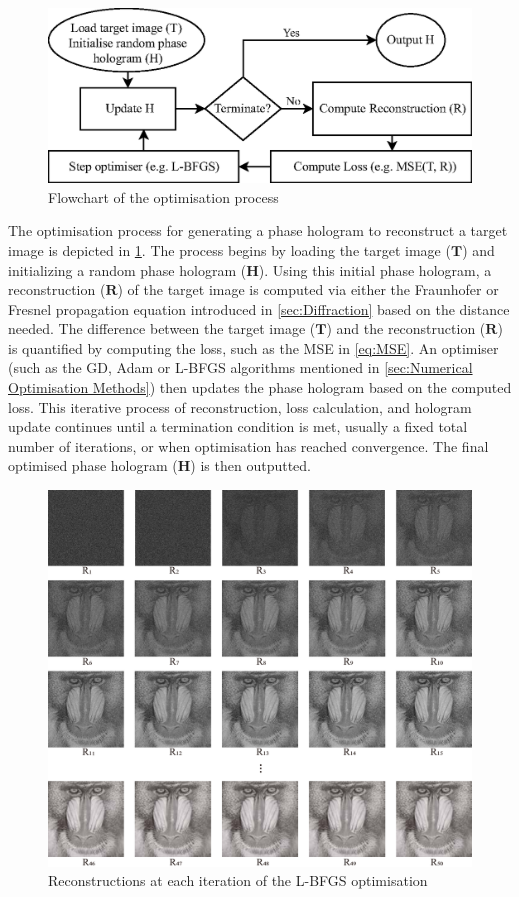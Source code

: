 \begin{figure}[H]
	\centering
	\includegraphics[width=\textwidth]{optim_flowchart_2D.eps}
	\caption{Flowchart of the optimisation process}
	\label{fig:optim_flowchart_2D}
\end{figure}

The optimisation process for generating a phase hologram to reconstruct a target image is depicted in \cref{fig:optim_flowchart_2D}. The process begins by loading the target image ($\textbf{T}$) and initializing a random phase hologram ($\textbf{H}$). Using this initial phase hologram, a reconstruction ($\textbf{R}$) of the target image is computed via either the Fraunhofer or Fresnel propagation equation introduced in \cref{sec:Diffraction} based on the distance needed. The difference between the target image ($\textbf{T}$) and the reconstruction ($\textbf{R}$) is quantified by computing the loss, such as the MSE in \cref{eq:MSE}. An optimiser (such as the GD, Adam or L-BFGS algorithms mentioned in \cref{sec:Numerical Optimisation Methods}) then updates the phase hologram based on the computed loss. This iterative process of reconstruction, loss calculation, and hologram update continues until a termination condition is met, usually a fixed total number of iterations, or when optimisation has reached convergence. The final optimised phase hologram ($\textbf{H}$) is then outputted.

\begin{figure}[H]
	\centering
	\includegraphics[width=\textwidth]{LBFGS_iters.pdf}
	\caption{Reconstructions at each iteration of the L-BFGS optimisation}
	\label{fig:LBFGS_iters}
\end{figure}


